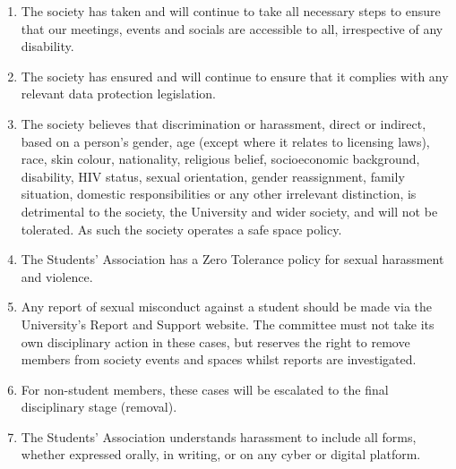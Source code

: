 \begin{enumerate}
    \item The society has taken and will continue to take all necessary steps to ensure that our meetings, events and socials are accessible to all, irrespective of any disability.

    \item The society has ensured and will continue to ensure that it complies with any relevant data protection legislation.

    \item The society believes that discrimination or harassment, direct or indirect, based on a person's gender, age (except where it relates to licensing laws), race, skin colour, nationality, religious belief, socioeconomic background, disability, HIV status, sexual orientation, gender reassignment, family situation, domestic responsibilities or any other irrelevant distinction, is detrimental to the society, the University and wider society, and will not be tolerated. As such the society operates a safe space policy.

    \item The Students' Association has a Zero Tolerance policy for sexual harassment and violence.

    \item Any report of sexual misconduct against a student should be made via the University’s Report and Support website. The committee must not take its own disciplinary action in these cases, but reserves the right to remove members from society events and spaces whilst reports are investigated.

    \item For non-student members, these cases will be escalated to the final disciplinary stage (removal).

    \item The Students' Association understands harassment to include all forms, whether expressed orally, in writing, or on any cyber or digital platform.
    

\end{enumerate}
